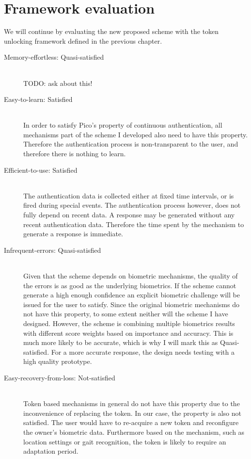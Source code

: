 \section{Framework evaluation}
We will continue by evaluating the new proposed scheme with the token unlocking framework defined in the previous chapter. 

\begin{description}
  \item[Memory-effortless: Quasi-satisfied] \hfill \\
  TODO: ask about this!
  
  \item[Easy-to-learn: Satisfied] \hfill \\
  In order to satisfy Pico's property of continuous authentication, all mechanisms part of the scheme I developed also need to have this property. Therefore the authentication process is non-transparent to the user, and therefore there is nothing to learn.
  
  \item[Efficient-to-use: Satisfied] \hfill \\
  The authentication data is collected either at fixed time intervals, or is fired during special events. The authentication process however, does not fully depend on recent data. A response may be generated without any recent authentication data. Therefore the time spent by the mechanism to generate a response is immediate.
  
  \item[Infrequent-errors: Quasi-satisfied] \hfill \\
  Given that the scheme depends on biometric mechanisms, the quality of the errors is as good as the underlying biometrics. If the scheme cannot generate a high enough confidence an explicit biometric challenge will be issued for the user to satisfy. Since the original biometric mechanisms do not have this property, to some extent neither will the scheme I have designed. However, the scheme is combining multiple biometrics results with different score weights based on importance and accuracy. This is much more likely to be accurate, which is why I will mark this as Quasi-satisfied. For a more accurate response, the design needs testing with a high quality prototype. 
  
  \item[Easy-recovery-from-loss: Not-satisfied] \hfill \\
  Token based mechanisms in general do not have this property due to the inconvenience of replacing the token. In our case, the property is also not satisfied. The user would have to re-acquire a new token and reconfigure the owner's biometric data. Furthermore based on the mechanism, such as location settings or gait recognition, the token is likely to require an adaptation period.
  

\end{description}

